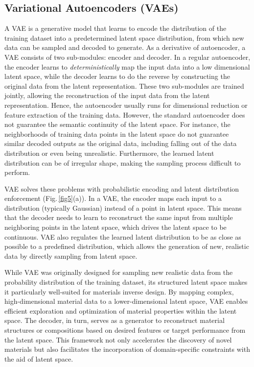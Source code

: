 \documentclass[fleqn,10pt]{wlscirep}
\begin{document}
\subsection{Variational Autoencoders (VAEs)}
A VAE is a generative model that learns to encode the distribution of the training dataset into a predetermined latent space distribution, from which new data can be sampled and decoded to generate\cite{kingma2013auto}. As a derivative of autoencoder, a VAE consists of two sub-modules: encoder and decoder. In a regular autoencoder, the encoder learns to \textit{deterministically} map the input data into a low dimensional latent space, while the decoder learns to do the reverse by constructing the original data from the latent representation. These two sub-modules are trained jointly, allowing the reconstruction of the input data from the latent representation. Hence, the autoencoder usually runs for dimensional reduction or feature extraction of the training data. However, the standard autoencoder does not guarantee the semantic continuity of the latent space. For instance, the neighborhoods of training data points in the latent space do not guarantee similar decoded outputs as the original data, including falling out of the data distribution or even being unrealistic. Furthermore, the learned latent distribution can be of irregular shape, making the sampling process difficult to perform. 

VAE solves these problems with probabilistic encoding and latent distribution enforcement (Fig.\,\ref{fig5}(a)). In a VAE, the encoder maps each input to a distribution (typically Gaussian) instead of a point in latent space. This means that the decoder needs to learn to reconstruct the same input from multiple neighboring points in the latent space, which drives the latent space to be continuous. VAE also regulates the learned latent distribution to be as close as possible to a predefined distribution, which allows the generation of new, realistic data by directly sampling from latent space.

While VAE was originally designed for sampling new realistic data from the probability distribution of the training dataset, its structured latent space makes it particularly well-suited for materials inverse design. By mapping complex, high-dimensional material data to a lower-dimensional latent space, VAE enables efficient exploration and optimization of material properties within the latent space. The decoder, in turn, serves as a generator to reconstruct material structures or compositions based on desired features or target performance from the latent space. This framework not only accelerates the discovery of novel materials but also facilitates the incorporation of domain-specific constraints with the aid of latent space.
\end{document}
